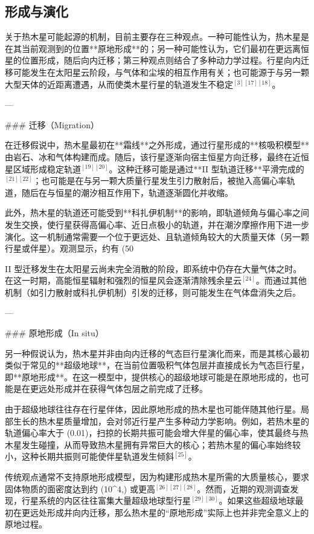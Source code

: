 \subsection{形成与演化}

关于热木星可能起源的机制，目前主要存在三种观点。一种可能性认为，热木星是在其当前观测到的位置**原地形成**的；另一种可能性认为，它们最初在更远离恒星的位置形成，随后向内迁移；第三种观点则结合了多种动力学过程。行星向内迁移可能发生在太阳星云阶段，与气体和尘埃的相互作用有关；也可能源于与另一颗大型天体的近距离遭遇，从而使类木星行星的轨道发生不稳定$^{[3][17][18]}$。

---

### 迁移（Migration）

在迁移假说中，热木星最初在**霜线**之外形成，通过行星形成的**核吸积模型**由岩石、冰和气体构建而成。随后，该行星逐渐向宿主恒星方向迁移，最终在近恒星区域形成稳定轨道$^{[19][20]}$。这种迁移可能是通过**II 型轨道迁移**平滑完成的$^{[21][22]}$；也可能是在与另一颗大质量行星发生引力散射后，被抛入高偏心率轨道，随后在与恒星的潮汐相互作用下，轨道逐渐圆化并收缩。

此外，热木星的轨道还可能受到**科扎伊机制**的影响，即轨道倾角与偏心率之间发生交换，使行星获得高偏心率、近日点极小的轨道，并在潮汐摩擦作用下进一步演化。这一机制通常需要一个位于更远处、且轨道倾角较大的大质量天体（另一颗行星或伴星）。观测显示，约有 (50%

II 型迁移发生在太阳星云尚未完全消散的阶段，即系统中仍存在大量气体之时。在这一时期，高能恒星辐射和强烈的恒星风会逐渐清除残余星云$^{[24]}$。而通过其他机制（如引力散射或科扎伊机制）引发的迁移，则可能发生在气体盘消失之后。

---

### 原地形成（In situ）

另一种假说认为，热木星并非由向内迁移的气态巨行星演化而来，而是其核心最初类似于常见的**超级地球**，在当前位置吸积气体包层并直接成长为气态巨行星，即**原地形成**。在这一模型中，提供核心的超级地球可能是在原地形成的，也可能是在更远处形成并在获得气体包层之前完成了迁移。

由于超级地球往往存在行星伴体，因此原地形成的热木星也可能伴随其他行星。局部生长的热木星质量增加，会对邻近行星产生多种动力学影响。例如，若热木星的轨道偏心率大于 (0.01)，扫掠的长期共振可能会增大伴星的偏心率，使其最终与热木星发生碰撞，从而导致热木星拥有异常巨大的核心；若热木星的偏心率始终较小，这种长期共振则可能使伴星轨道发生倾斜$^{[25]}$。

传统观点通常不支持原地形成模型，因为构建形成热木星所需的大质量核心，要求固体物质的面密度达到约 (10^4,) 或更高$^{[26][27][28]}$。然而，近期的观测调查发现，行星系统的内区往往富集大量超级地球型行星$^{[29][30]}$。如果这些超级地球最初在更远处形成并向内迁移，那么热木星的“原地形成”实际上也并非完全意义上的原地过程。

